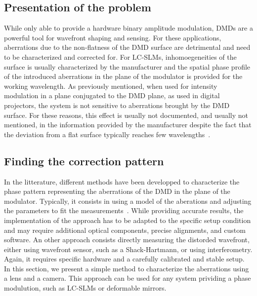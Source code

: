\documentclass[12pt]{iopart}
\begin{document}
\subsection{Presentation of the problem}

While only able to provide a hardware binary amplitude modulation,
DMDs are a powerful tool for wavefront shaping and sensing. 
For these applications, 
aberrations due to the non-flatness of the DMD surface 
are detrimental and need to be characterized and corrected for. 
For LC-SLMs, inhomoegeneities of the surface is usually characterized by the 
manufacturer and the spatial phase profile of the introduced aberrations 
in the plane of the modulator is provided for the working wavelength.
As previously mentioned,
when used for intensity modulation in a plane conjugated to the DMD plane, 
as used in digital projectors, 
the system is not sensitive to aberrations brought by the DMD surface.
For these reasons, this effect is usually not documented, 
and usually not mentioned, in the information provided by the manufacturer 
despite the fact that the deviation from a flat surface
typically reaches few wavelengths~\cite{Brown2021multicolor}.
\\

\subsection{Finding the correction pattern}

In the litterature, different methods have been developped to characterize 
the phase pattern representing the aberrations of the DMD in the 
plane of the modulator. 
Typically, it consists in using a model of the aberations 
and adjusting the parameters to fit the measurements~\cite{Matthes2019Optical,Scholes2019structured, Brown2021multicolor}.
While providing accurate results, 
the implementation of the approach has to be adapted to the specific 
setup condition and may require
additional optical components, 
precise alignments, 
and custom software. 
An other approach consists directly measuring the distorded wavefront, 
either using wavefront sensor, such as a Shack-Hartmann, 
or using interferometry. 
Again, it requires specific hardware and 
a carefully calibrated and stable setup.
In this section, we present a simple method to characterize the aberrations using a lens and a camera. 
This approach can be used for any system prividing a phase modulution, 
such as LC-SLMs or deformable mirrors.\\
\end{document}
